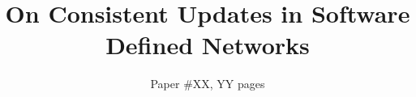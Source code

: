 \documentclass{sig-alternate-10pt-2013}
\title{On Consistent Updates in Software Defined Networks}
\author{
Paper \#XX, YY pages
}
\begin{document}
\maketitle

\newcommand{\paragraphb}[1]{\vspace{0.03in}\noindent{\bf #1} }
\newcommand{\paragraphe}[1]{\vspace{0.03in}\noindent{\em #1} }
\newcommand{\paragraphbe}[1]{\vspace{0.03in}\noindent{\bf \em #1} }

\newcommand{\prooffontsize}{\fontsize{8pt}{9.3pt}\selectfont}
\newcommand{\cready}{\textcolor{black}}
\newcommand{\newcomment}{\textcolor{black}}

\newcommand{\ratul}[1]{{\color{blue}{#1}}}
\newcommand{\roger}[1]{{\color{green}{#1}}}

\newcommand{\swan}{\normalsize S{\small WAN}\xspace}
\newcommand{\swansmall}{\small S{\scriptsize WAN}\xspace}
\newcommand{\cflow}{Vflow\xspace}
\newcommand{\flow}{vflow\xspace}
\newcommand{\flows}{vflows\xspace}

\newcommand{\topolarge}{\textsf{IDN}\xspace}
\newcommand{\toposmall}{\textsf{G-Scale}\xspace}

\newcommand{\corule}{Rule\xspace}
\newcommand{\orule}{rule\xspace}
\newcommand{\orules}{rules\xspace}

\newcommand{\cpr}{Service\xspace}
\newcommand{\pr}{service\xspace}

\newcommand{\cprops}{Service properties\xspace}
\newcommand{\props}{service properties\xspace}

\newcommand{\trurl}{\url{http://somewhere}}

\newcommand{\fixme}[1]{{\bf\textcolor{red}{[#1]}}}

\newcommand{\helpme}[1]{{\bf\textcolor{red}{#1}}}

\newcommand{\figtocapskip}{\vspace{-6pt}}
\newcommand{\figtocapbigskip}{\vspace{-9pt}}
\end{document}
